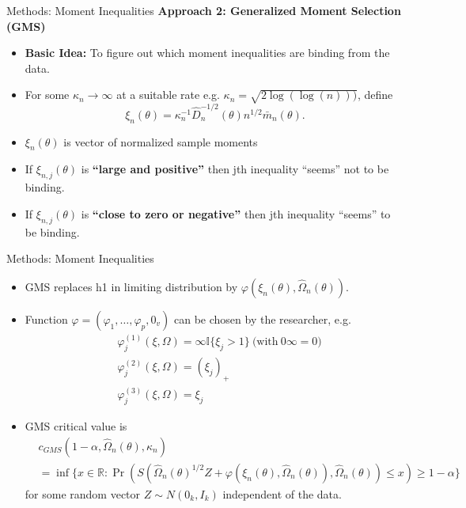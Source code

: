\documentclass[aspectratio=169]{beamer}  %
\begin{document}
\begin{frame}{Methods: Moment Inequalities}
    \textbf{Approach 2: Generalized Moment Selection (GMS)} 
    \begin{itemize}
        \item \textbf{Basic Idea:} To figure out which moment inequalities are binding from the data.
        \item For some $\kappa_{n}\to\infty$ at a suitable rate e.g. $\kappa_n=\sqrt{2\log(\log(n)))}$, define $$\xi_n(\theta)=\kappa_n^{-1}\hat{D}_n^{-1/2}(\theta)n^{1/2}\bar{m}_n(\theta).$$
        \item $\xi_n(\theta)$ is vector of normalized sample moments
        \item If $\xi_{n,j}(\theta)$ is \textbf{“large and positive”} then jth inequality “seems” not to be binding.
        \item If $\xi_{n,j}(\theta)$ is \textbf{“close to zero or negative”} then jth inequality “seems” to be binding.
    \end{itemize}
\end{frame}

\begin{frame}{Methods: Moment Inequalities}
    \begin{itemize}
        \item GMS replaces h1 in limiting distribution by $\varphi(\xi_n(\theta),\hat{\Omega}_n(\theta))$.
        \item Function $\varphi=(\varphi_1,\ldots,\varphi_p,0_v)$ can be chosen by the researcher, e.g.
        $$\begin{aligned}&\varphi_j^{(1)}(\xi,\Omega)=\infty\mathbb{I}\{\xi_j>1\}\mathrm{~(with~0}\infty=0)\\&\varphi_j^{(2)}(\xi,\Omega)=(\xi_j)_+\\&\varphi_j^{(3)}(\xi,\Omega)=\xi_j\end{aligned}$$
        \item GMS critical value is $$\begin{aligned}&c_{GMS}(1-\alpha,\hat{\Omega}_n(\theta),\kappa_n)\\&=\inf\{x\in\mathbb{R}:\Pr(S(\hat{\Omega}_n(\theta)^{1/2}Z+\varphi(\xi_n(\theta),\hat{\Omega}_n(\theta)),\hat{\Omega}_n(\theta))\leq x)\geq1-\alpha\}\end{aligned}$$ for some random vector $Z\sim N(0_k,I_k)$ independent of the data.
    \end{itemize}
\end{frame}
\end{document}
